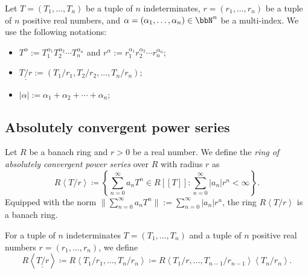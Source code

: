 

     \begin{notation}\label{notation:mult-label_for_Tate_algebra}
        Let \(T = (T_1, \ldots, T_n)\) be a tuple of \(n\) indeterminates, \(r = (r_1, \ldots, r_n)\) be a tuple of \(n\) positive real numbers, and \(\alpha = (\alpha_1, \ldots, \alpha_n) \in \bbN^n\) be a multi-index.
        We use the following notations:
        \begin{itemize}
            \item \(T^\alpha := T_1^{\alpha_1} T_2^{\alpha_2} \cdots T_n^{\alpha_n}\) and \(r^\alpha := r_1^{\alpha_1} r_2^{\alpha_2} \cdots r_n^{\alpha_n}\);
            \item \(\underline{T/r} := (T_1/r_1, T_2/r_2, \ldots, T_n/r_n)\);
            \item \(|\alpha| := \alpha_1 + \alpha_2 + \cdots + \alpha_n\);
        \end{itemize}
    \end{notation}


\subsection{Absolutely convergent power series}

    \begin{definition}\label{def:ring_of_absolutely_convergent_power_series}
        Let \(R\) be a banach ring and \(r > 0\) be a real number.
        We define the \emph{ring of absolutely convergent power series} over \(R\) with radius \(r\) as
        \[ R\left<T/r\right> \coloneqq \left\{\sum_{n=0}^{\infty} a_n T^n \in R[[T]] : \sum_{n=0}^{\infty} |a_n| r^n < \infty \right\}. \]
        Equipped with the norm \(\|\sum_{n=0}^{\infty} a_n T^n\| := \sum_{n=0}^{\infty} |a_n| r^n\), the ring \(R\left<T/r\right>\) is a banach ring.

        For a tuple of \(n\) indeterminates \(T = (T_1, \ldots, T_n)\) and a tuple of \(n\) positive real numbers \(r = (r_1, \ldots, r_n)\), we define
        \[ R\left<\underline{T/r}\right> \coloneq R\left<T_1/r_1, \ldots, T_n/r_n\right> \coloneq R\left<T_1/r, \ldots, T_{n-1}/r_{n-1}\right>\left<T_n/r_n\right>. \]
    \end{definition}

